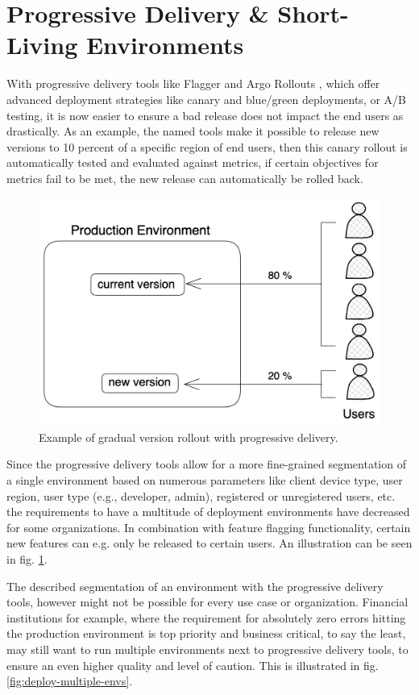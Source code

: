 \section{Progressive Delivery \& Short-Living Environments}

With progressive delivery tools like
Flagger
\autocite{flaggerWebsite}
and
Argo Rollouts
\autocite{argoRolloutsWebsite},
which offer advanced deployment strategies
like canary and blue/green deployments, or A/B testing,
it is now easier to ensure a bad release does not impact the end users
as drastically.
As an example, the named tools make it possible to release new versions
to 10 percent of a specific region of end users,
then this canary rollout is automatically tested and evaluated against metrics,
if certain objectives for metrics fail to be met,
the new release can automatically be rolled back.

\begin{figure}[h]
	\centering
	\includegraphics[width=0.75\linewidth]{assets/progressive-delivery.png}
	\caption{Example of gradual version rollout with progressive delivery.
	}
	\label{fig:progressive-delivery}	
\end{figure}

Since the progressive delivery tools allow for a more
fine-grained segmentation
of a single environment based on numerous parameters like
client device type, user region, user type (e.g., developer, admin),
registered or unregistered users, etc.
the requirements to have a multitude of deployment environments
have decreased for some organizations.
In combination with feature flagging functionality,
certain new features can e.g. only be released to certain users.
An illustration can be seen in fig. \ref{fig:progressive-delivery}.

The described segmentation of an environment with the progressive delivery
tools, however might not be possible for every use case or organization.
Financial institutions for example, where the requirement for absolutely zero
errors hitting the production environment is top priority and business critical,
to say the least,
may still want to run multiple environments next to progressive delivery tools,
to ensure an even higher quality and level of caution.
This is illustrated in fig. \ref{fig:deploy-multiple-envs}.


